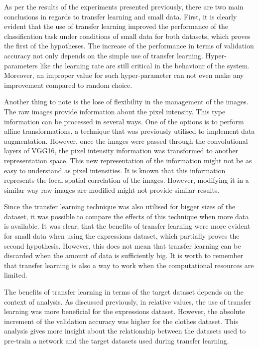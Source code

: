 \documentclass{article}
\begin{document}
As per the results of the experiments presented previously, there are two main conclusions in regards to transfer learning and small data. First, it is clearly evident that the use of transfer learning improved the performance of the classification task under conditions of small data for both datasets, which proves the first of the hypotheses. The increase of the performance in terms of validation accuracy not only depends on the simple use of transfer learning. Hyper-parameters like the learning rate are still critical in the behaviour of the system. Moreover, an improper value for such hyper-parameter can not even make any improvement compared to random choice. 

Another thing to note is the lose of flexibility in the management of the images. The raw images provide information about the pixel intensity. This type information can be processed in several ways. One of the options is to perform affine transformations, a technique that was previously utilised to implement data augmentation. However, once the images were passed through the convolutional layers of VGG16, the pixel intensity information was transformed to another representation space. This new representation of the information might not be as easy to understand as pixel intensities. It is known that this information represents the local spatial correlation of the images. However, modifying it in a similar way raw images are modified might not provide similar results.

Since the transfer learning technique was also utilised for bigger sizes of the dataset, it was possible to compare the effects of this technique when more data is available. It was clear, that the benefits of transfer learning were more evident for small data when using the expressions dataset, which partially proves the second hypothesis. However, this does not mean that transfer learning can be discarded when the amount of data is sufficiently big. It is worth to remember that transfer learning is also a way to work when the computational resources are limited.

The benefits of transfer learning in terms of the target dataset depends on the context of analysis. As discussed previously, in relative values, the use of transfer learning was more beneficial for the expressions dataset. However, the absolute increment of the validation accuracy was higher for the clothes dataset. This analysis gives more insight about the relationship between the datasets used to pre-train a network and the target datasets used during transfer learning.     
 
\end{document}
